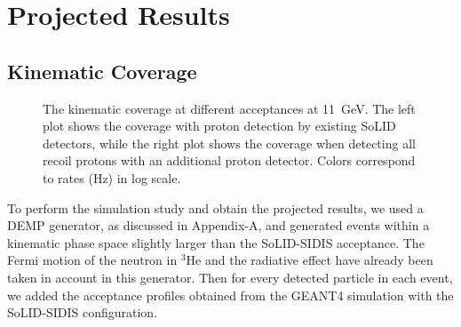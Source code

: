 \section{Projected Results}

\subsection{Kinematic Coverage}

\begin{figure}[!ht]
 \begin{center}
 \caption[The kinematic coverage at different acceptances.]{\footnotesize{The
     kinematic coverage at different acceptances at 11~GeV. The left plot
     shows the coverage with proton detection by existing SoLID
     detectors, while the right plot shows the coverage when detecting all
recoil protons with an additional proton detector. Colors correspond to rates
(Hz) in log scale.}}
  \label{kin_cor}
  \end{center}
\end{figure}

To perform the simulation study and obtain the projected results, we used a
DEMP generator, as discussed in Appendix-A, and generated events within a
kinematic phase space slightly larger than the SoLID-SIDIS acceptance.  The
Fermi motion of the neutron in $\mathrm{^{3}He}$ and the radiative effect have
already been taken in account in this generator.  Then for every detected
particle in each event, we added the acceptance profiles obtained from the
GEANT4 simulation with the SoLID-SIDIS configuration.

